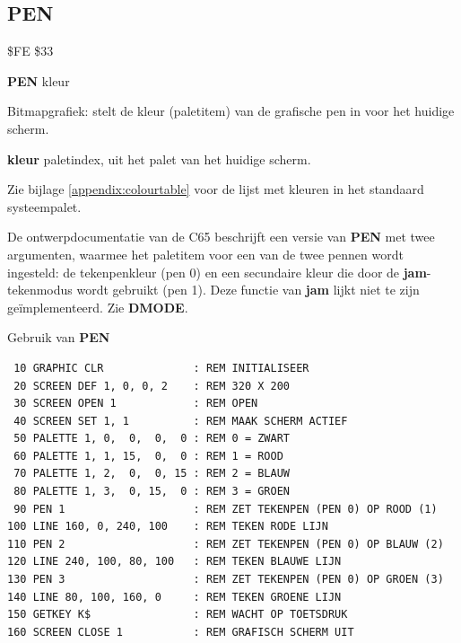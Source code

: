 \subsection{PEN}
\begin{description}[leftmargin=2cm,style=nextline]
\item [Token:]    \$FE \$33

\item [Formaat:]   {\bf PEN} kleur

\item [Gebruik:]    Bitmapgrafiek: stelt de kleur (paletitem) van de grafische pen in voor het huidige scherm.

{\bf kleur} paletindex, uit het palet van het huidige scherm.

                  Zie bijlage \vref{appendix:colourtable} voor de lijst met kleuren in het standaard systeempalet.

\item [Opmerkingen:]  De ontwerpdocumentatie van de C65 beschrijft een versie van {\bf PEN} met twee argumenten, waarmee het paletitem voor een van de twee pennen wordt ingesteld: de tekenpenkleur (pen 0) en een secundaire kleur die door de {\bf jam}-tekenmodus wordt gebruikt (pen 1). Deze functie van {\bf jam} lijkt niet te zijn geïmplementeerd. Zie {\bf DMODE}.

\item [Voorbeeld:]  Gebruik van {\bf PEN}

\begin{tcolorbox}[colback=black,coltext=white]
\verbatimfont{\codefont}
\begin{verbatim}
 10 GRAPHIC CLR              : REM INITIALISEER
 20 SCREEN DEF 1, 0, 0, 2    : REM 320 X 200
 30 SCREEN OPEN 1            : REM OPEN
 40 SCREEN SET 1, 1          : REM MAAK SCHERM ACTIEF
 50 PALETTE 1, 0,  0,  0,  0 : REM 0 = ZWART
 60 PALETTE 1, 1, 15,  0,  0 : REM 1 = ROOD
 70 PALETTE 1, 2,  0,  0, 15 : REM 2 = BLAUW
 80 PALETTE 1, 3,  0, 15,  0 : REM 3 = GROEN
 90 PEN 1                    : REM ZET TEKENPEN (PEN 0) OP ROOD (1)
100 LINE 160, 0, 240, 100    : REM TEKEN RODE LIJN
110 PEN 2                    : REM ZET TEKENPEN (PEN 0) OP BLAUW (2)
120 LINE 240, 100, 80, 100   : REM TEKEN BLAUWE LIJN
130 PEN 3                    : REM ZET TEKENPEN (PEN 0) OP GROEN (3)
140 LINE 80, 100, 160, 0     : REM TEKEN GROENE LIJN
150 GETKEY K$                : REM WACHT OP TOETSDRUK
160 SCREEN CLOSE 1           : REM GRAFISCH SCHERM UIT
\end{verbatim}
\end{tcolorbox}
\end{description}

